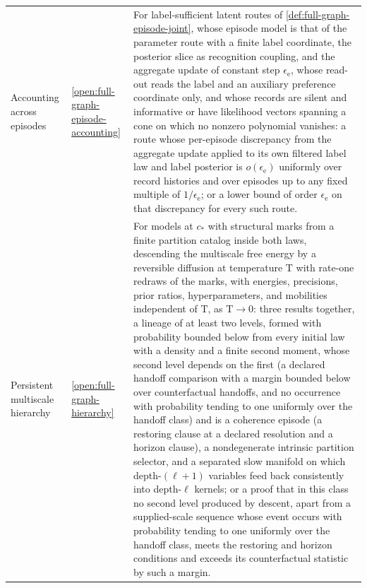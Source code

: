 {\begin{longtable}{@{}>{\raggedright\arraybackslash}p{}
>{\raggedright\arraybackslash}p{}
>{\raggedright\arraybackslash}p{}@{}}
Accounting across episodes & \cref{open:full-graph-episode-accounting} & For label-sufficient latent routes of \cref{def:full-graph-episode-joint}, whose episode model is that of the parameter route with a finite label coordinate, the posterior slice as recognition coupling, and the aggregate update of constant step $\epsilon_{\mathrm e}$, whose read-out reads the label and an auxiliary preference coordinate only, and whose records are silent and informative or have likelihood vectors spanning a cone on which no nonzero polynomial vanishes: a route whose per-episode discrepancy from the aggregate update applied to its own filtered label law and label posterior is $o(\epsilon_{\mathrm e})$ uniformly over record histories and over episodes up to any fixed multiple of $1/\epsilon_{\mathrm e}$; or a lower bound of order $\epsilon_{\mathrm e}$ on that discrepancy for every such route. \\
Persistent multiscale hierarchy & \cref{open:full-graph-hierarchy} & For models at $c_*$ with structural marks from a finite partition catalog inside both laws, descending the multiscale free energy by a reversible diffusion at temperature $\mathrm T$ with rate-one redraws of the marks, with energies, precisions, prior ratios, hyperparameters, and mobilities independent of $\mathrm T$, as $\mathrm T\to0$: three results together, a lineage of at least two levels, formed with probability bounded below from every initial law with a density and a finite second moment, whose second level depends on the first (a declared handoff comparison with a margin bounded below over counterfactual handoffs, and no occurrence with probability tending to one uniformly over the handoff class) and is a coherence episode (a restoring clause at a declared resolution and a horizon clause), a nondegenerate intrinsic partition selector, and a separated slow manifold on which depth-$(\ell+1)$ variables feed back consistently into depth-$\ell$ kernels; or a proof that in this class no second level produced by descent, apart from a supplied-scale sequence whose event occurs with probability tending to one uniformly over the handoff class, meets the restoring and horizon conditions and exceeds its counterfactual statistic by such a margin. \\

\end{longtable}}
